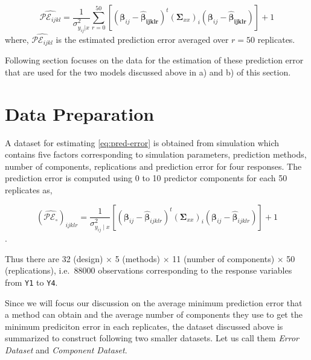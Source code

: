\documentclass[12pt,3p,authoryear]{elsarticle}
\begin{document}
\begin{equation}
\widehat{\mathcal{PE}_{ijkl}} = \frac{1}{\sigma_{y_{ij}|x}^2}
  \sum_{r=0}^{50}{\left[\left(\boldsymbol{\beta}_{ij} - 
  \boldsymbol{\hat{\beta}_{ijklr}}\right)^t
  \left(\boldsymbol{\Sigma}_{xx}\right)_i
  \left(\boldsymbol{\beta}_{ij} - \boldsymbol{\hat{\beta}_{ijklr}}\right)\right]} + 1
\label{eq:estimated-pred-error}
\end{equation} where, \(\widehat{\mathcal{PE}_{ijkl}}\) is the estimated
prediction error averaged over \(r=50\) replicates.

Following section focuses on the data for the estimation of these
prediction error that are used for the two models discussed above in a)
and b) of this section.

\hypertarget{data-preparation}{%
\section{Data Preparation}\label{data-preparation}}

A dataset for estimating \eqref{eq:pred-error} is obtained from simulation
which contains five factors corresponding to simulation parameters,
prediction methods, number of components, replications and prediction
error for four responses. The prediction error is computed using 0 to 10
predictor components for each 50 replicates as,

\begin{equation*}
\left(\widehat{\mathcal{PE_\circ}}\right)_{ijklr} =
  \frac{1}{\sigma_{y_{ij}\mid x}^2}\left[
    \left(\boldsymbol{\beta}_{ij} - \hat{\boldsymbol{\beta}}_{ijklr}\right)^t
    \left(\boldsymbol{\Sigma}_{xx}\right)_{i}
    \left(\boldsymbol{\beta}_{ij} - \hat{\boldsymbol{\beta}}_{ijklr}\right)
  \right] + 1
\end{equation*}.

Thus there are 32 (design) \(\times\) 5 (methods) \(\times\) 11 (number
of components) \(\times\) 50 (replications), i.e.~88000 observations
corresponding to the response variables from \texttt{Y1} to \texttt{Y4}.

Since we will focus our discussion on the average minimum prediction
error that a method can obtain and the average number of components they
use to get the minimum prediciton error in each replicates, the dataset
discussed above is summarized to construct following two smaller
datasets. Let us call them \emph{Error Dataset} and \emph{Component
Dataset}.
\end{document}
